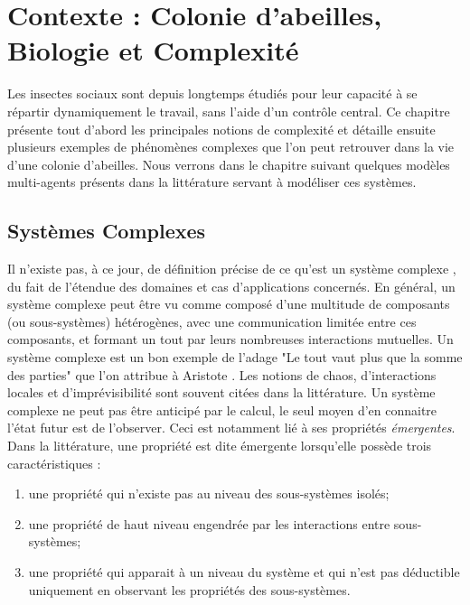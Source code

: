 \chapter{Contexte : Colonie d'abeilles, Biologie et Complexité}
\label{ChapitreContexte}
	
	Les insectes sociaux sont depuis longtemps étudiés pour leur capacité à se répartir dynamiquement le travail, sans l'aide d'un contrôle central. Ce chapitre présente tout d'abord les principales notions de complexité et détaille ensuite plusieurs exemples de phénomènes complexes que l'on peut retrouver dans la vie d'une colonie d'abeilles. Nous verrons dans le chapitre suivant quelques modèles multi-agents présents dans la littérature servant à modéliser ces systèmes.

	
		\section{Systèmes Complexes}
		
			Il n'existe pas, à ce jour, de définition précise de ce qu'est un système complexe \cite{heylighen_complexity_2008}, du fait de l'étendue des domaines et cas d'applications concernés. En général, un système complexe peut être vu comme composé d'une multitude de composants (ou sous-systèmes) hétérogènes, avec une communication limitée entre ces composants, et formant un tout par leurs nombreuses interactions mutuelles. Un système complexe est un bon exemple de l'adage "Le tout vaut plus que la somme des parties" que l'on attribue à Aristote \cite{edmonds_what_1995}. Les notions de chaos, d'interactions locales et d'imprévisibilité sont souvent citées dans la littérature. Un système complexe ne peut pas être anticipé par le calcul, le seul moyen d'en connaitre l'état futur est de l'observer. 
			Ceci est notamment lié à ses propriétés \textit{émergentes}. Dans la littérature, une propriété est dite émergente lorsqu'elle possède trois caractéristiques \cite{breckling_emergent_2005} :
			\begin{enumerate}
				\item une propriété qui n'existe pas au niveau des sous-systèmes isolés;
				\item une propriété de haut niveau engendrée par les interactions entre sous-systèmes;
				\item une propriété qui apparait à un niveau du système et qui n'est pas déductible uniquement en observant les propriétés des sous-systèmes.
			\end{enumerate}
			
